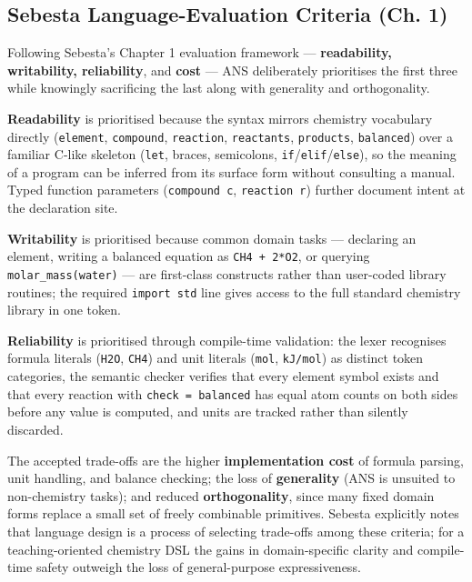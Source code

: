 \documentclass[11pt,a4paper]{article}
\newcommand{\code}[1]{\texttt{#1}}
\begin{document}
\subsection{Sebesta Language-Evaluation Criteria (Ch. 1)}

Following Sebesta's Chapter 1 evaluation framework --- \textbf{readability, writability, reliability}, and \textbf{cost} --- ANS deliberately prioritises the first three while knowingly sacrificing the last along with generality and orthogonality.

\textbf{Readability} is prioritised because the syntax mirrors chemistry vocabulary directly (\code{element}, \code{compound}, \code{reaction}, \code{reactants}, \code{products}, \code{balanced}) over a familiar C-like skeleton (\code{let}, braces, semicolons, \code{if}/\code{elif}/\code{else}), so the meaning of a program can be inferred from its surface form without consulting a manual. Typed function parameters (\code{compound c}, \code{reaction r}) further document intent at the declaration site.

\textbf{Writability} is prioritised because common domain tasks --- declaring an element, writing a balanced equation as \code{CH4 + 2*O2}, or querying \code{molar\_mass(water)} --- are first-class constructs rather than user-coded library routines; the required \code{import std} line gives access to the full standard chemistry library in one token.

\textbf{Reliability} is prioritised through compile-time validation: the lexer recognises formula literals (\code{H2O}, \code{CH4}) and unit literals (\code{mol}, \code{kJ/mol}) as distinct token categories, the semantic checker verifies that every element symbol exists and that every reaction with \code{check = balanced} has equal atom counts on both sides before any value is computed, and units are tracked rather than silently discarded.

The accepted trade-offs are the higher \textbf{implementation cost} of formula parsing, unit handling, and balance checking; the loss of \textbf{generality} (ANS is unsuited to non-chemistry tasks); and reduced \textbf{orthogonality}, since many fixed domain forms replace a small set of freely combinable primitives. Sebesta explicitly notes that language design is a process of selecting trade-offs among these criteria; for a teaching-oriented chemistry DSL the gains in domain-specific clarity and compile-time safety outweigh the loss of general-purpose expressiveness.

\newpage
\end{document}

